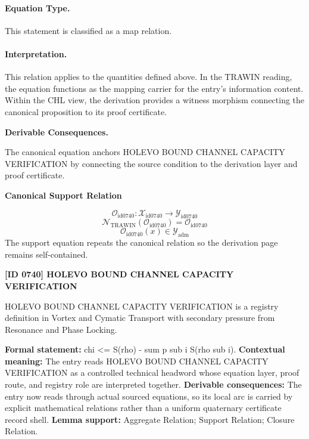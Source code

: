 \paragraph{Equation Type.}
This statement is classified as a map relation.

\paragraph{Interpretation.}
This relation applies to the quantities defined above. In the TRAWIN reading, the equation functions as the mapping carrier for the entry’s information content. Within the CHL view, the derivation provides a witness morphism connecting the canonical proposition to its proof certificate.

\par\vspace{0.35em}
\noindent\textbf{Derivable Consequences.}\quad
\begingroup
\footnotesize
\raggedright
The canonical equation anchors HOLEVO BOUND CHANNEL CAPACITY VERIFICATION by connecting the source condition to the derivation layer and proof certificate.
\par\endgroup

\noindent\textbf{Canonical Support Relation}\par
\[
\mathcal{O}_{\mathrm{id0740}}:\mathcal{X}_{\mathrm{id0740}}\longrightarrow\mathcal{Y}_{\mathrm{id0740}}
\]
\[
\mathcal{N}_{\mathrm{TRAWIN}}(\mathcal{O}_{\mathrm{id0740}})=\mathcal{O}_{\mathrm{id0740}}
\]
\[
\mathcal{O}_{\mathrm{id0740}}(x)\in\mathcal{Y}_{\mathrm{adm}}
\]
\noindent The support equation repeats the canonical relation so the derivation page remains self-contained.\par

\clearpage
\noindent\textbf{[ID 0740] HOLEVO BOUND CHANNEL CAPACITY VERIFICATION}\par
\vspace{0.35em}
\begingroup\small
{}
HOLEVO BOUND CHANNEL CAPACITY VERIFICATION is a registry definition in Vortex and Cymatic Transport with secondary pressure from Resonance and Phase Locking.

\begingroup\footnotesize\setlength{\emergencystretch}{3em}\sloppy
\textbf{Formal statement:} chi <= S(rho) - sum p sub i S(rho sub i). \textbf{Contextual meaning:} The entry reads HOLEVO BOUND CHANNEL CAPACITY VERIFICATION as a controlled technical headword whose equation layer, proof route, and registry role are interpreted together. \textbf{Derivable consequences:} The entry now reads through actual sourced equations, so its local arc is carried by explicit mathematical relations rather than a uniform quaternary certificate record shell. \textbf{Lemma support:} Aggregate Relation; Support Relation; Closure Relation.\par
\endgroup

